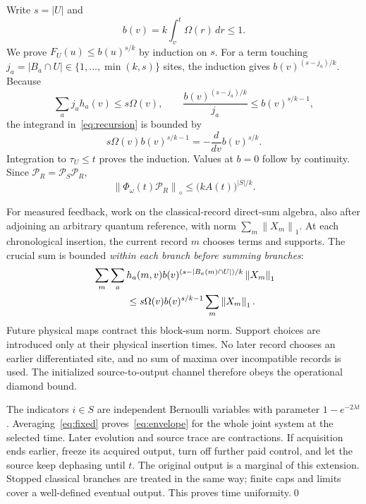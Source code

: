 \documentclass[11pt,a4paper]{article}
\newcommand{\norm}[1]{\left\lVert #1\right\rVert}
\newcommand{\Pcal}{\mathcal P}
\begin{document}
Write $s=|U|$ and
\begin{equation}
 b(v)=k\int_v^t\Omega(r)\,dr\le1.
\end{equation}
We prove $F_U(u)\le b(u)^{s/k}$ by induction on $s$. For a term touching $j_a=|B_a\cap U|\in\{1,\ldots,\min(k,s)\}$ sites, the induction gives $b(v)^{(s-j_a)/k}$. Because
\begin{equation}
 \sum_a j_a h_a(v)\le s\Omega(v),\qquad
 \frac{b(v)^{(s-j_a)/k}}{j_a}\le b(v)^{s/k-1},
\end{equation}
the integrand in~\eqref{eq:recursion} is bounded by
\begin{equation}
 s\Omega(v)b(v)^{s/k-1}=-\frac{d}{dv}b(v)^{s/k}.
\end{equation}
Integration to $\tau_U\le t$ proves the induction. Values at $b=0$ follow by continuity. Since $\Pcal_R=\Pcal_S\Pcal_R$,
\begin{equation}
 \norm{\Phi_\omega(t)\Pcal_R}_\diamond\le\bigl(kA(t)\bigr)^{|S|/k}.
 \label{eq:fixed}
\end{equation}

For measured feedback, work on the classical-record direct-sum algebra, also after adjoining an arbitrary quantum reference, with norm $\sum_m\norm{X_m}_1$. At each chronological insertion, the current record $m$ chooses terms and supports. The crucial sum is bounded \emph{within each branch before summing branches}:
\begin{align}
 &\sum_m\sum_a h_a(m,v)b(v)^{(s-|B_a(m)\cap U|)/k}\norm{X_m}_1\nonumber\\
 &\hspace{12mm}\le s\Omega(v)b(v)^{s/k-1}\sum_m\norm{X_m}_1.
\end{align}
Future physical maps contract this block-sum norm. Support choices are introduced only at their physical insertion times. No later record chooses an earlier differentiated site, and no sum of maxima over incompatible records is used. The initialized source-to-output channel therefore obeys the operational diamond bound.

The indicators $i\in S$ are independent Bernoulli variables with parameter $1-e^{-2\lambda t}$. Averaging~\eqref{eq:fixed} proves~\eqref{eq:envelope} for the whole joint system at the selected time. Later evolution and source trace are contractions. If acquisition ends earlier, freeze its acquired output, turn off further paid control, and let the source keep dephasing until $t$. The original output is a marginal of this extension. Stopped classical branches are treated in the same way; finite caps and limits cover a well-defined eventual output. This proves time uniformity.\qed
\end{document}
